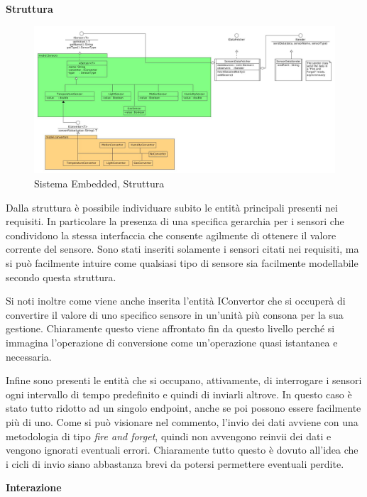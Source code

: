 \begin{center}
 \textbf{Struttura}
\end{center}

\begin{figure}[h]
\centering
\includegraphics[width=\textwidth]{Figures/DomainModel/EmbeddedSystem/Structure}
\caption{Sistema Embedded, Struttura}
\end{figure}

Dalla struttura \`e possibile individuare subito le entit\`a principali presenti nei requisiti. In particolare la presenza di una specifica gerarchia per i sensori che condividono la stessa interfaccia che consente agilmente di ottenere il valore corrente del sensore. Sono stati inseriti solamente i sensori citati nei requisiti, ma si pu\`o facilmente intuire come qualsiasi tipo di sensore sia facilmente modellabile secondo questa struttura.

Si noti inoltre come viene anche inserita l'entit\`a IConvertor che si occuper\`a di convertire il valore di uno specifico sensore in un'unit\`a pi\`u consona per la sua gestione. Chiaramente questo viene affrontato fin da questo livello perch\'e si immagina l'operazione di conversione come un'operazione quasi istantanea e necessaria.

Infine sono presenti le entit\`a che si occupano, attivamente, di interrogare i sensori ogni intervallo di tempo predefinito e quindi di inviarli altrove. In questo caso \`e stato tutto ridotto ad un singolo endpoint, anche se poi possono essere facilmente pi\`u di uno. Come si pu\`o visionare nel commento, l'invio dei dati avviene con una metodologia di tipo \textit{fire and forget}, quindi non avvengono reinvii dei dati e vengono ignorati eventuali errori. Chiaramente tutto questo \`e dovuto all'idea che i cicli di invio siano abbastanza brevi da potersi permettere eventuali perdite.

\begin{center}
\textbf{Interazione}
\end{center}


